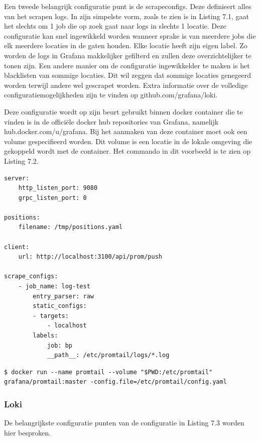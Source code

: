 Een tweede belangrijk configuratie punt is de scrapeconfigs. Deze definieert alles van het scrapen logs. In zijn simpelste vorm, zoals te zien is in Listing 7.1, gaat het slechts om 1 job die op zoek gaat naar logs in slechts 1 locatie. Deze configuratie kan snel ingewikkeld worden wanneer sprake is van meerdere jobs die elk meerdere locaties in de gaten houden. Elke locatie heeft zijn eigen label. Zo worden de logs in Grafana makkelijker gefilterd en zullen deze overzichtelijker te tonen zijn. Een andere manier om de configuratie ingewikkelder te maken is het blacklisten van sommige locaties. Dit wil zeggen dat sommige locaties genegeerd worden terwijl andere wel gescrapet worden. Extra informatie over de volledige configuratiemogelijkheden zijn te vinden op github.com/grafana/loki.

Deze configuratie wordt op zijn beurt gebruikt binnen docker container die te vinden is in de officiële docker hub repositories van Grafana, namelijk hub.docker.com/u/grafana. Bij het aanmaken van deze container moet ook een volume gespecifieerd worden. Dit volume is een locatie in de lokale omgeving die gekoppeld wordt met de container. Het commando in dit voorbeeld is te zien op Listing 7.2.

\begin{lstlisting}[caption=promtail-config yaml file ]
server:
    http_listen_port: 9080
    grpc_listen_port: 0

positions:
    filename: /tmp/positions.yaml

client:
    url: http://localhost:3100/api/prom/push

scrape_configs:
    - job_name: log-test
        entry_parser: raw
        static_configs:
        - targets:
            - localhost
        labels:
            job: bp
            __path__: /etc/promtail/logs/*.log  
\end{lstlisting}

\begin{lstlisting}[caption=Aanmaken van de promtail container]
$ docker run --name promtail --volume "$PWD:/etc/promtail" grafana/promtail:master -config.file=/etc/promtail/config.yaml
\end{lstlisting}

\subsubsection{Loki}

De belangrijkste configuratie punten van de configuratie in Listing 7.3 worden hier besproken.

